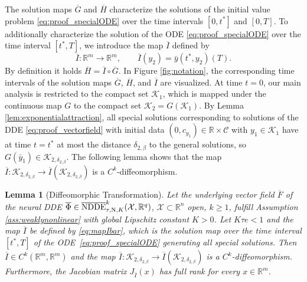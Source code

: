 \documentclass[10pt]{article}
\numberwithin{equation}{section}
\newtheorem{lemma}[theorem]{Lemma}
\begin{document}
	The solution maps $\overline{G}$ and $\overline{H}$ characterize the solutions of the initial value problem \eqref{eq:proof_specialODE} over the time intervals $[0,t^\ast]$ and $[0,T]$. To additionally characterize the solution of the ODE \eqref{eq:proof_specialODE} over the time interval $[t^\ast,T]$, we introduce the map $\overline{I}$ defined by
	\begin{equation} \label{eq:mapIbar}
		\overline{I}: \mathbb{R}^m \rightarrow \mathbb{R}^m,
		\qquad \overline{I}(y_2) =\bar{y}(t^\ast,y_2)(T).
	\end{equation}
	By definition it holds $\overline{H} = \overline{I}\circ \overline{G}$.  In Figure \ref{fig:notation}, the corresponding time intervals of the solution maps $\overline{G}$, $\overline{H}$, and $\overline{I}$ are visualized. At time $t = 0$, our main analysis is restricted to the compact set $\mathcal{K}_1$, which is mapped under the continuous map $G$ to the compact set $\mathcal{K}_2 = G(\mathcal{K}_1)$. By Lemma \ref{lem:exponentialattraction}, all special solutions corresponding to solutions of the DDE \eqref{eq:proof_vectorfield} with initial data $(0,c_{y_1})\in \mathbb{R}\times \mathcal{C}$ with $y_1 \in \mathcal{K}_1$ have at time $t=t^\ast$ at most the distance $\delta_{2,\beta}$ to the general solutions, so $G(\bar{y}_1) \in \mathcal{K}_{2,\delta_{2,\beta}}$. The following lemma shows that the map $\overline{I}: \mathcal{K}_{2,\delta_{2,\beta}} \rightarrow \overline{I}(\mathcal{K}_{2,\delta_{2,\beta}})$ is a $C^k$-diffeomorphism.
	
	
	\begin{lemma}[Diffeomorphic Transformation] \label{lem:diffeomorphisms}
		Let the underlying vector field $\overline{F}$ of the neural DDE $\overline{\Phi}\in\overline{\textup{NDDE}}^k_{\tau,\textup{N},K}(\mathcal{X},\mathbb{R}^q)$, $\mathcal{X}\subset \mathbb{R}^n$ open, $k \geq 1$, fulfill Assumption \ref{ass:weaklynonlinear} with global Lipschitz constant $K>0$. Let $K\tau e <1$ and the map $\overline{I}$ be defined by \eqref{eq:mapIbar}, which is the solution map over the time interval $[t^\ast,T]$ of the ODE~\eqref{eq:proof_specialODE} generating all special solutions. Then $\overline{I}\in C^k(\mathbb{R}^m,\mathbb{R}^m)$ and the map $\overline{I}: \mathcal{K}_{2,\delta_{2,\beta}} \rightarrow \overline{I}(\mathcal{K}_{2,\delta_{2,\beta}})$ is a $C^k$-diffeomorphism. Furthermore, the Jacobian matrix $J_{\overline{I}}(x)$ has full rank for every $x \in \mathbb{R}^m$.
	\end{lemma}
	
\end{document}
